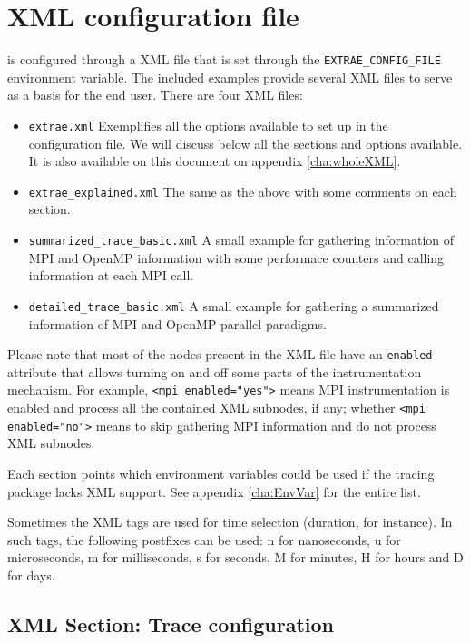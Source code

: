 \chapter{\TRACE XML configuration file}\label{cha:XML}

\TRACE is configured through a XML file that is set through the {\tt EXTRAE\_CONFIG\_FILE} environment variable. The included examples provide several XML files to serve as a basis for the end user. There are four XML files:
\begin{itemize}
 \item {\tt extrae.xml} Exemplifies all the options available to set up in the configuration file. We will discuss below all the sections and options available. It is also available on this document on appendix \ref{cha:wholeXML}.
 \item {\tt extrae\_explained.xml} The same as the above with some comments on each section.
 \item {\tt summarized\_trace\_basic.xml} A small example for gathering information of MPI and OpenMP information with some performace counters and calling information at each MPI call.
 \item {\tt detailed\_trace\_basic.xml} A small example for gathering a summarized information of MPI and OpenMP parallel paradigms.
\end{itemize}

Please note that most of the nodes present in the XML file have an {\tt enabled} attribute that allows turning on and off some parts of the instrumentation mechanism. For example, {\tt <mpi enabled="yes">} means MPI instrumentation is enabled and process all the contained XML subnodes, if any; whether {\tt <mpi enabled="no">} means to skip gathering MPI information and do not process XML subnodes.

Each section points which environment variables could be used if the tracing package lacks XML support. See appendix \ref{cha:EnvVar} for the entire list.

Sometimes the XML tags are used for time selection (duration, for instance). In such tags, the following postfixes can be used: n for nanoseconds, u for microseconds, m for milliseconds, s for seconds, M for minutes, H for hours and D for days.

\section{XML Section: Trace configuration}\label{sec:XMLSectionTraceConfiguration}

